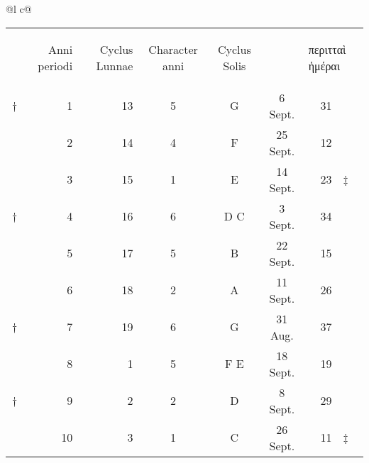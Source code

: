 %
\footnotesize
\centering
\begin{tabular}{@{}l c@{}}
\toprule
 \\
\midrule
\addlinespace

\begin{tabular}[t]{@{}r rrcccr l@{}}
~ &
\begin{rotate}{60}Anni periodi\end{rotate} &
\begin{rotate}{60}Cyclus Lunnae\end{rotate} &
\begin{rotate}{60}Character anni\end{rotate} &
\begin{rotate}{60}Cyclus Solis\end{rotate} &
&
\multicolumn{2}{l}{\begin{turn}{60}\textgreek{περιτταὶ ἡμέραι}\end{turn}}
\\
\cmidrule{2-7}
† &  1 & 13 &  5 &  G  &  6 Sept. & 31 & ~ \\
~ &  2 & 14 &  4 &  F  & 25 Sept. & 12 & ~ \\
~ &  3 & 15 &  1 &  E  & 14 Sept. & 23 & ‡ \\
† &  4 & 16 &  6 & D C &  3 Sept. & 34 & ~ \\
\cmidrule{2-7}
~ &  5 & 17 &  5 &  B  & 22 Sept. & 15 \\
~ &  6 & 18 &  2 &  A  & 11 Sept. & 26 \\
† &  7 & 19 &  6 &  G  & 31 Aug.  & 37 \\
~ &  8 &  1 &  5 & F E & 18 Sept. & 19 \\
\cmidrule{2-7}
† &  9 &  2 &  2 &  D  &  8 Sept. & 29 & ~\\
~ & 10 &  3 &  1 &  C  & 26 Sept. & 11 & ‡ \\

\end{tabular}
\end{tabular}
